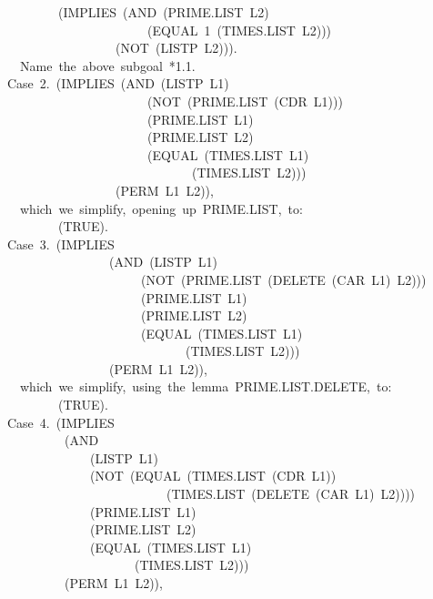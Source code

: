 \documentclass[11pt]{book}
\newenvironment{pubasis}{\begin{flushleft}\ttfamily\small}{\normalsize\rmfamily\end{flushleft}}
\begin{document}
\begin{pubasis}
~~~~~~~~(IMPLIES~(AND~(PRIME.LIST~L2)\\
~~~~~~~~~~~~~~~~~~~~~~(EQUAL~1~(TIMES.LIST~L2)))\\
~~~~~~~~~~~~~~~~~(NOT~(LISTP~L2))).\\

~~Name~the~above~subgoal~*1.1.\\

Case~2.~(IMPLIES~(AND~(LISTP~L1)\\
~~~~~~~~~~~~~~~~~~~~~~(NOT~(PRIME.LIST~(CDR~L1)))\\
~~~~~~~~~~~~~~~~~~~~~~(PRIME.LIST~L1)\\
~~~~~~~~~~~~~~~~~~~~~~(PRIME.LIST~L2)\\
~~~~~~~~~~~~~~~~~~~~~~(EQUAL~(TIMES.LIST~L1)\\
~~~~~~~~~~~~~~~~~~~~~~~~~~~~~(TIMES.LIST~L2)))\\
~~~~~~~~~~~~~~~~~(PERM~L1~L2)),\\

~~which~we~simplify,~opening~up~PRIME.LIST,~to:\\

~~~~~~~~(TRUE).\\

Case~3.~(IMPLIES\\
~~~~~~~~~~~~~~~~(AND~(LISTP~L1)\\
~~~~~~~~~~~~~~~~~~~~~(NOT~(PRIME.LIST~(DELETE~(CAR~L1)~L2)))\\
~~~~~~~~~~~~~~~~~~~~~(PRIME.LIST~L1)\\
~~~~~~~~~~~~~~~~~~~~~(PRIME.LIST~L2)\\
~~~~~~~~~~~~~~~~~~~~~(EQUAL~(TIMES.LIST~L1)\\
~~~~~~~~~~~~~~~~~~~~~~~~~~~~(TIMES.LIST~L2)))\\
~~~~~~~~~~~~~~~~(PERM~L1~L2)),\\

~~which~we~simplify,~using~the~lemma~PRIME.LIST.DELETE,~to:\\

~~~~~~~~(TRUE).\\

Case~4.~(IMPLIES\\
~~~~~~~~~(AND\\
~~~~~~~~~~~~~(LISTP~L1)\\
~~~~~~~~~~~~~(NOT~(EQUAL~(TIMES.LIST~(CDR~L1))\\
~~~~~~~~~~~~~~~~~~~~~~~~~(TIMES.LIST~(DELETE~(CAR~L1)~L2))))\\
~~~~~~~~~~~~~(PRIME.LIST~L1)\\
~~~~~~~~~~~~~(PRIME.LIST~L2)\\
~~~~~~~~~~~~~(EQUAL~(TIMES.LIST~L1)\\
~~~~~~~~~~~~~~~~~~~~(TIMES.LIST~L2)))\\
~~~~~~~~~(PERM~L1~L2)),\\


\end{pubasis}
\end{document}
